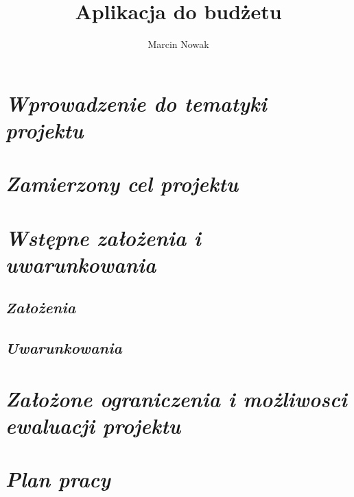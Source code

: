 \documentclass[a4paper,12pt]{book}
\newcommand{\customstyletitle}[1]{\Large{\textbf{#1}}}
\newcommand{\customstylechapter}[1]{\Large{\textit{#1}}}
\newcommand{\customstylesection}[1]{\textbf{\textit{#1}}}
\begin{document}
\title{\customstyletitle{Aplikacja do budżetu}}
\author{Marcin Nowak}
\date{}

\maketitle                          %
\let\cleardoublepage\clearpage

\renewcommand*\contentsname{Spis treści}
\tableofcontents                    %

\pagestyle{fancy}
\fancyhf{}          %
\renewcommand{\headrulewidth}{2pt}
\renewcommand{\footrulewidth}{1pt}
\fancyhead[L]{\leftmark}
\fancyhead[RO]{\rightmark}
\fancyfoot[L,RO]{\thepage}


\chapter{\customstylechapter{Wprowadzenie do tematyki projektu}}

\chapter{\customstylechapter{Zamierzony cel projektu}}


\chapter{\customstylechapter{Wstępne założenia i uwarunkowania}}

\section{\customstylesection{Założenia}}

\section{\customstylesection{Uwarunkowania}}


\chapter{\customstylechapter{Założone ograniczenia i możliwosci ewaluacji projektu}}

\chapter{\customstylechapter{Plan pracy}}
\end{document}
